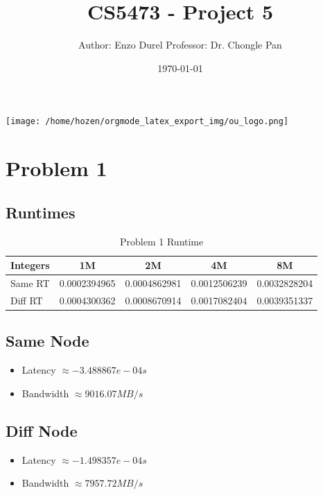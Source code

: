 \documentclass[11pt]{article}
\author{Author: Enzo Durel \newline Professor: Dr. Chongle Pan}
\date{\today}
\title{CS5473 - Project 5}
\begin{document}
\maketitle
\begin{center}
\texttt{[image: /home/hozen/orgmode\_latex\_export\_img/ou\_logo.png]}
\end{center}
\thispagestyle{empty}
\setcounter{tocdepth}{2}
\tableofcontents
\clearpage
{}
\thispagestyle{empty}
\listoffigures
\clearpage
{} 
\thispagestyle{empty}
\listoftables
\clearpage
{} 
\newpage
\section{Problem 1}
\label{sec:orgb9f73d5}
\subsection{Runtimes}
\label{sec:org3df8b78}

\begin{table}[htbp]
\caption{Problem 1 Runtime}
\centering
\begin{tabular}{|l|c|c|c|c|}
\hline
Integers & 1M & 2M & 4M & 8M\\
\hline
Same RT & 0.0002394965 & 0.0004862981 & 0.0012506239 & 0.0032828204\\
\hline
Diff RT & 0.0004300362 & 0.0008670914 & 0.0017082404 & 0.0039351337\\
\hline
\end{tabular}
\end{table}
\subsection{Same Node}
\label{sec:orged9f242}

\begin{itemize}
\item Latency \(\approx -3.488867e-04 s\)
\item Bandwidth \(\approx 9016.07 MB/s\)
\end{itemize}
\subsection{Diff Node}
\label{sec:org287a141}

\begin{itemize}
\item Latency \(\approx -1.498357e-04 s\)
\item Bandwidth \(\approx 7957.72 MB/s\)
\end{itemize}
\end{document}
